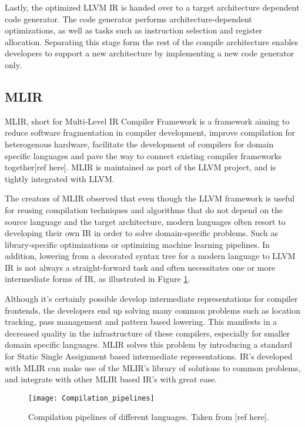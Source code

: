 Lastly, the optimized LLVM IR is handed over to a target architecture dependent code generator.
The code generator performs architecture-dependent optimizations, as well as tasks such as instruction selection and register allocation.
Separating this stage form the rest of the compile architecture enables developers to support a new architecture by implementing a new code generator only.

\subsection{MLIR}
MLIR, short for Multi-Level IR Compiler Framework is a framework aiming to reduce software fragmentation in compiler development, improve compilation for heterogenous hardware, facilitate the development of compilers for domain specific languages and pave the way to connect existing compiler frameworks together[ref here].
MLIR is maintained as part of the LLVM project, and is tightly integrated with LLVM.

The creators of MLIR observed that even though the LLVM framework is useful for reusing compilation techniques and algorithms that do not depend on
the source language and the target architecture, modern languages often resort to developing their own IR in order to solve domain-specific problems.
Such as library-specific optimizations or optimizing machine learning pipelines.
In addition, lowering from a decorated syntax tree for a modern language to LLVM IR is not always a straight-forward task and often necessitates one or more intermediate forms of IR, as illustrated in Figure \ref{compilationPipelines}.

Although it's certainly possible develop intermediate representations for compiler frontends, the developers end up solving many common problems such as 
location tracking, pass management and pattern based lowering.
This manifests in a decreased quality in the infrastructure of these compilers, especially for smaller domain specific languages.
MLIR solves this problem by introducing a standard for Static Single Assignment based intermediate representations.
IR's developed with MLIR can make use of the MLIR's library of solutions to common problems, and integrate with other MLIR based IR's with great ease.

\begin{figure}[h]
    \centering
    \texttt{[image: Compilation\_pipelines]}
    \caption{Compilation pipelines of different languages. Taken from [ref here].}
    \label{compilationPipelines}
\end{figure}

